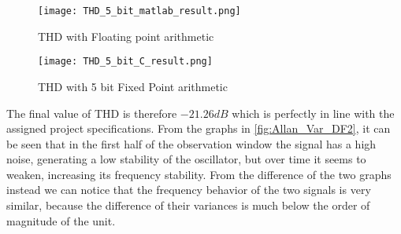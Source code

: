 \begin{figure}[ht]
	\begin{minipage}[b]{0.5\linewidth}
		\centering
		\texttt{[image: THD\_5\_bit\_matlab\_result.png]}
		\caption{THD with Floating point arithmetic}
		\label{fig:THD_5_bit_FL_P}
	\end{minipage}
	\hspace{0.5cm}
	\begin{minipage}[b]{0.5\linewidth}
		\centering
		\texttt{[image: THD\_5\_bit\_C\_result.png]}
		\caption{THD with 5 bit Fixed Point arithmetic}
		\label{fig:THD_5_bit_FIX_P}
	\end{minipage}
\end{figure}

\noindent The final value of THD is therefore $-21.26 dB$ which is perfectly in line with the assigned project specifications.
From the graphs in \autoref{fig:Allan_Var_DF2}, it can be seen that in the first half of the observation window the signal has a high noise, generating a low stability of the oscillator, but over time it seems to weaken, increasing its frequency stability. From the difference of the two graphs instead we can notice that the frequency behavior of the two signals is very similar, because the difference of their variances is much below the order of magnitude of the unit.
